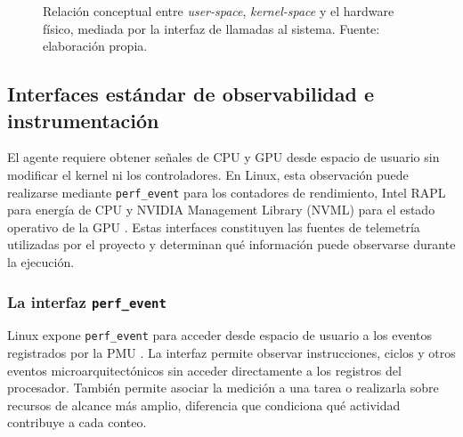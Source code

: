 \begin{figure}[H]
\caption[Espacios de usuario y de kernel]{Relación conceptual entre \textit{user-space}, \textit{kernel-space} y el hardware físico, mediada por la interfaz de llamadas al sistema. Fuente: elaboración propia.}
\label{fig:user-kernel-space}
\end{figure}

\subsection{Interfaces estándar de observabilidad e instrumentación}
\label{sec:marco-interfaces}

El agente requiere obtener señales de CPU y GPU desde espacio de usuario sin
modificar el kernel ni los controladores. En Linux, esta observación puede
realizarse mediante \texttt{perf\_event} para los contadores de rendimiento,
Intel RAPL para energía de CPU y NVIDIA Management Library (NVML) para el
estado operativo de la GPU
\cite{Weaver2015,David2010,NVML2026}. Estas interfaces constituyen las fuentes
de telemetría utilizadas por el proyecto y determinan qué información puede
observarse durante la ejecución.

\subsubsection{La interfaz \texttt{perf\_event}}
\label{sec:perfevent}

Linux expone \texttt{perf\_event} para acceder desde espacio de usuario a los
eventos registrados por la PMU \cite{LinuxPerfEventOpen2026}. La interfaz
permite observar instrucciones, ciclos y otros eventos microarquitectónicos
sin acceder directamente a los registros del procesador. También permite
asociar la medición a una tarea o realizarla sobre recursos de alcance más
amplio, diferencia que condiciona qué actividad contribuye a cada conteo.

